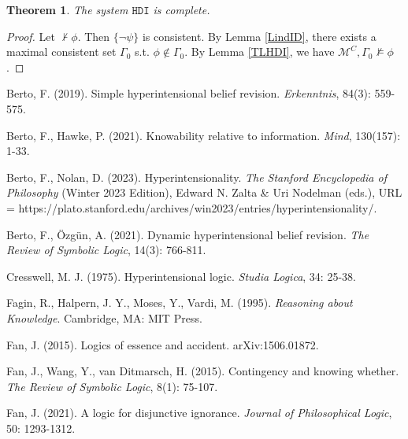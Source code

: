 \documentclass{article}
\newtheorem{theor}{Theorem}
\begin{document}
\begin{theor}

The system $\mathtt{HDI}$ is complete.

\end{theor}


\begin{proof}

Let $\not \vdash \phi$. Then $\{\neg \psi\}$ is consistent. By Lemma \ref{LindID}, there exists a maximal consistent set $\Gamma_{0}$ s.t. $\phi \not \in \Gamma_{0}$. By Lemma \ref{TLHDI}, we have $\mathcal{M}^{C}, \Gamma_{0} \not \models \phi$.

\end{proof}





 Berto, F. (2019). Simple hyperintensional belief revision. \textit{Erkenntnis}, 84(3): 559-575.


 Berto, F., Hawke, P. (2021). Knowability relative to information. \textit{Mind}, 130(157): 1-33.

 Berto, F., Nolan, D. (2023). Hyperintensionality. \textit{The Stanford Encyclopedia of Philosophy} (Winter 2023 Edition), Edward N. Zalta \& Uri Nodelman (eds.), URL = https://plato.stanford.edu/archives/win2023/entries/hyperintensionality/.

 Berto, F.,  \"{O}zg\"{u}n, A. (2021). Dynamic hyperintensional belief revision. \textit{The Review of Symbolic Logic}, 14(3): 766-811.

 Cresswell, M. J. (1975). Hyperintensional logic. \textit{Studia Logica}, 34: 25-38.

 Fagin, R., Halpern, J. Y., Moses, Y., Vardi, M. (1995). \textit{Reasoning about Knowledge}. Cambridge, MA: MIT Press.

 Fan, J. (2015). Logics of essence and accident. arXiv:1506.01872.

 Fan, J., Wang, Y., van Ditmarsch, H. (2015). Contingency and knowing whether. \textit{The Review of Symbolic Logic}, 8(1): 75-107.

 Fan, J. (2021). A logic for disjunctive ignorance. \textit{Journal of Philosophical Logic}, 50: 1293-1312.
\end{document}
